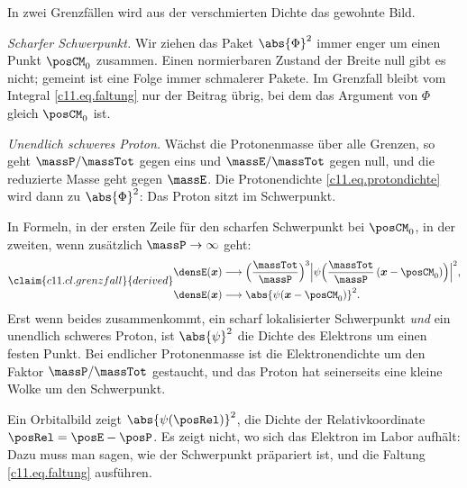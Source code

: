 In zwei Grenzfällen wird aus der verschmierten Dichte das gewohnte Bild.

\emph{Scharfer Schwerpunkt.} Wir ziehen das Paket $\abs{\Phi}^2$ immer enger um einen
Punkt $\posCM_0$ zusammen. Einen normierbaren Zustand der Breite null gibt es nicht;
gemeint ist eine Folge immer schmalerer Pakete. Im Grenzfall bleibt vom Integral
\eqref{c11.eq.faltung} nur der Beitrag übrig, bei dem das Argument von $\Phi$ gleich
$\posCM_0$ ist.

\emph{Unendlich schweres Proton.} Wächst die Protonenmasse über alle Grenzen, so geht
$\massP/\massTot$ gegen eins und $\massE/\massTot$ gegen null, und die reduzierte Masse
geht gegen $\massE$. Die Protonendichte \eqref{c11.eq.protondichte} wird dann zu
$\abs{\Phi}^2$: Das Proton sitzt im Schwerpunkt.

In Formeln, in der ersten Zeile für den scharfen Schwerpunkt bei $\posCM_0$, in der
zweiten, wenn zusätzlich $\massP \to \infty$ geht:
\begin{equation}\label{c11.eq.grenzfall}\claim{c11.cl.grenzfall}{derived}
  \begin{aligned}
    \densE(\boldsymbol{x})
    &\longrightarrow \Bigl(\frac{\massTot}{\massP}\Bigr)^{3}
      \Bigl\lvert \psi\Bigl(\frac{\massTot}{\massP}\,(\boldsymbol{x} - \posCM_0)\Bigr)
      \Bigr\rvert^2, \\
    \densE(\boldsymbol{x})
    &\longrightarrow \abs{\psi(\boldsymbol{x} - \posCM_0)}^2 .
  \end{aligned}
\end{equation}
Erst wenn beides zusammenkommt, ein scharf lokalisierter Schwerpunkt \emph{und} ein
unendlich schweres Proton, ist $\abs{\psi}^2$ die Dichte des Elektrons um einen festen
Punkt. Bei endlicher Protonenmasse ist die Elektronendichte um den Faktor
$\massP/\massTot$ gestaucht, und das Proton hat seinerseits eine kleine Wolke um den
Schwerpunkt.

\begin{merksatz}
  Ein Orbitalbild zeigt $\abs{\psi(\posRel)}^2$, die Dichte der Relativkoordinate
  $\posRel = \posE - \posP$. Es zeigt nicht, wo sich das Elektron im Labor aufhält: Dazu
  muss man sagen, wie der Schwerpunkt präpariert ist, und die Faltung
  \eqref{c11.eq.faltung} ausführen.
\end{merksatz}

